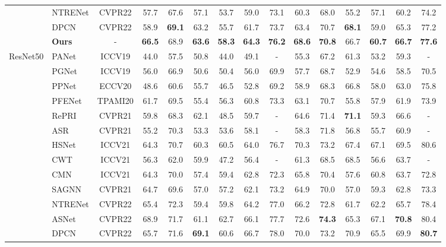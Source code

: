 \documentclass[journal]{IEEEtran}
\begin{document}
\begin{table*}[t]
\begin{center}
\begin{tabular}{c|lc|cccccc|cccccc}
&NTRENet \cite{liu2022learning}& CVPR22& 57.7& 67.6&57.1&53.7&59.0&73.1&60.3&68.0&55.2&57.1&60.2&74.2\\  
&DPCN \cite{liu2022dynamic} &CVPR22&58.9&\textbf{69.1}&63.2&55.7&61.7&73.7&63.4&70.7&\textbf{68.1}&59.0&65.3&77.2\\                        
                           \cline{2-15}
                          & \textbf{Ours}   &      -        & \textbf{66.5} & 68.9 & \textbf{63.6} & \textbf{58.3} & \textbf{64.3} & \textbf{76.2}   & \textbf{68.6} & \textbf{70.8} & 66.7 & \textbf{60.7} & \textbf{66.7} & \textbf{77.6}   \\ \cline{1-15}
\multirow{13}{*}{ResNet50} & PANet \cite{wang2019panet} & ICCV19             & 44.0 & 57.5 & 50.8 & 44.0 & 49.1 & -      & 55.3 & 67.2 & 61.3 & 53.2 & 59.3 & -      \\
                          & PGNet \cite{zhang2019pyramid} &  ICCV19             & 56.0 & 66.9 & 50.6 & 50.4 & 56.0 & 69.9   & 57.7 & 68.7 & 52.9 & 54.6 & 58.5 & 70.5   \\
                          & PPNet \cite{liu2020part}  &  ECCV20           & 48.6 & 60.6 & 55.7 & 46.5 & 52.8 & 69.2   & 58.9 & 68.3 & 66.8 & 58.0 & 63.0 & 75.8   \\
                          & PFENet \cite{tian2020prior} & TPAMI20              & 61.7 & 69.5 & 55.4 & 56.3 & 60.8 & 73.3   & 63.1 & 70.7 & 55.8 & 57.9 & 61.9 & 73.9   \\
                          & RePRI \cite{boudiaf2021few}  & CVPR21            & 59.8 & 68.3 & 62.1 & 48.5 & 59.7 & -      & 64.6 & 71.4 & \textbf{71.1} & 59.3 & 66.6 & -      \\
                         & ASR\cite{liu2021anti} & CVPR21 & 55.2 & 70.3 & 53.3 & 53.6 & 58.1 & - & 58.3 & 71.8 & 56.8 & 55.7 & 60.9 & - \\
                         & HSNet \cite{min2021hypercorrelation} & ICCV21           & 64.3 & 70.7 & 60.3 & 60.5 & 64.0 & 76.7   & 70.3 & 73.2 & 67.4 & 67.1 & 69.5 & 80.6   \\
&CWT\cite{lu2021simpler}&ICCV21&56.3&62.0&59.9&47.2&56.4&-&61.3&68.5&68.5&56.6&63.7&-\\
&CMN \cite{xie2021few} &ICCV21&64.3&70.0&57.4&59.4&62.8&72.3&65.8&70.4&57.6&60.8&63.7&72.8\\
&SAGNN \cite{xie2021scale} &CVPR21&64.7&69.6&57.0&57.2&62.1&73.2&64.9&70.0&57.0&59.3&62.8&73.3\\
 &NTRENet \cite{liu2022learning}& CVPR22&65.4&72.3&59.4&59.8&64.2&77.0&66.2&72.8&61.7&62.2&65.7&78.4\\
 &ASNet \cite{kang2022integrative} &CVPR22&68.9&71.7&61.1&62.7&66.1&77.7&72.6&\textbf{74.3}&65.3&67.1&\textbf{70.8}&80.4\\
 &DPCN \cite{liu2022dynamic} &CVPR22&65.7&71.6&\textbf{69.1}&60.6&66.7&78.0&70.0&73.2&70.9&65.5&69.9&\textbf{80.7}\\


\end{tabular}
\end{center}
\end{table*}
\end{document}
